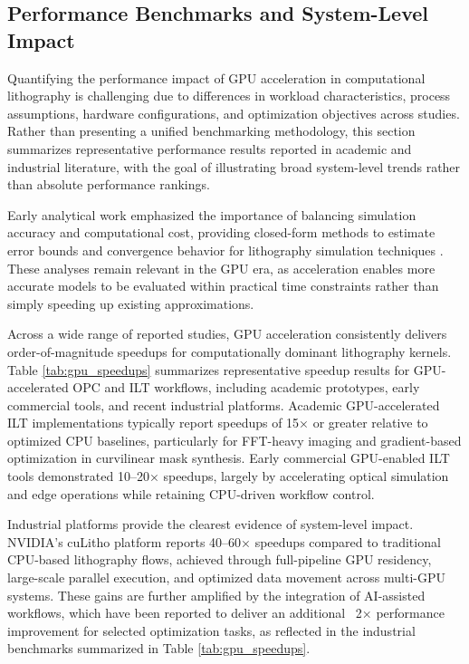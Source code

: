 \documentclass[pdflatex,sn-mathphys-num]{sn-jnl}%
\theoremstyle{thmstyleone}%
\theoremstyle{thmstyletwo}%
\theoremstyle{thmstylethree}%
\begin{document}
  
\subsection{Performance Benchmarks and System-Level Impact}


Quantifying the performance impact of GPU acceleration in computational lithography is challenging due to differences in workload characteristics, process assumptions, hardware configurations, and optimization objectives across studies. Rather than presenting a unified benchmarking methodology, this section summarizes representative performance results reported in academic and industrial literature, with the goal of illustrating broad system-level trends rather than absolute performance rankings.

Early analytical work emphasized the importance of balancing simulation accuracy and computational cost, providing closed-form methods to estimate error bounds and convergence behavior for lithography simulation techniques \cite{smith2003methods}. These analyses remain relevant in the GPU era, as acceleration enables more accurate models to be evaluated within practical time constraints rather than simply speeding up existing approximations.

Across a wide range of reported studies, GPU acceleration consistently delivers order-of-magnitude speedups for computationally dominant lithography kernels. Table \ref{tab:gpu_speedups} summarizes representative speedup results for GPU-accelerated OPC and ILT workflows, including academic prototypes, early commercial tools, and recent industrial platforms. Academic GPU-accelerated ILT implementations typically report speedups of 15× or greater relative to optimized CPU baselines, particularly for FFT-heavy imaging and gradient-based optimization in curvilinear mask synthesis. Early commercial GPU-enabled ILT tools demonstrated 10–20× speedups, largely by accelerating optical simulation and edge operations while retaining CPU-driven workflow control.

Industrial platforms provide the clearest evidence of system-level impact. NVIDIA’s cuLitho platform reports 40–60× speedups compared to traditional CPU-based lithography flows, achieved through full-pipeline GPU residency, large-scale parallel execution, and optimized data movement across multi-GPU systems. These gains are further amplified by the integration of AI-assisted workflows, which have been reported to deliver an additional ~2× performance improvement for selected optimization tasks, as reflected in the industrial benchmarks summarized in Table \ref{tab:gpu_speedups}.
\end{document}
